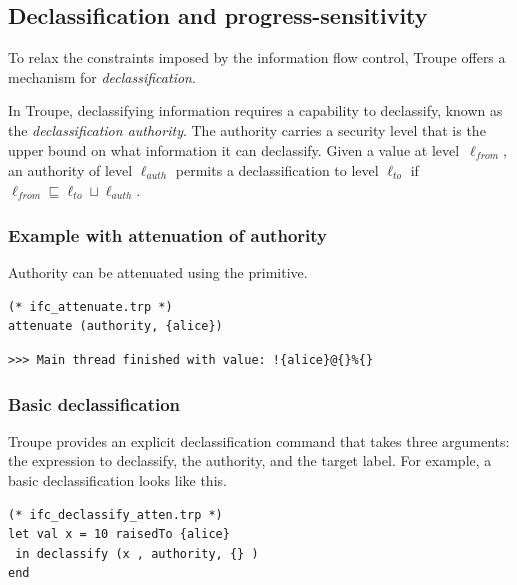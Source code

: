 \subsection{Declassification and progress-sensitivity}
\label{sec:declassification}
To relax the constraints imposed by the information flow control, Troupe offers 
a mechanism for \emph{declassification}. 

In Troupe, declassifying information requires a capability to declassify,
known as the \emph{declassification authority}. 
The authority carries a security level that is the upper bound 
on what information it can declassify. 
%
Given  a value at 
level~$\ell_{\mathit{from}}$, an authority of 
level $\ell_{\mathit{auth}}$ permits a declassification to level 
$\ell_{\mathit{to}}$ if
${\ell_{\mathit{from}}} \sqsubseteq {  \ell_{\mathit{to}} \sqcup \ell_{\mathit{auth}}}.$



\subsubsection{Example with attenuation of authority}
Authority can be attenuated using the  primitive. 

\begin{lstlisting}
(* ifc_attenuate.trp *)
attenuate (authority, {alice})    
\end{lstlisting}
\begin{verbatim}
>>> Main thread finished with value: !{alice}@{}%{}    
\end{verbatim}

\subsubsection{Basic declassification}
Troupe provides an explicit declassification command  that takes three arguments: 
the expression to declassify, the authority, and the target label. For example, a basic declassification
looks like this. 
\begin{lstlisting}
(* ifc_declassify_atten.trp *)
let val x = 10 raisedTo {alice}
 in declassify (x , authority, {} )
end 
\end{lstlisting}

